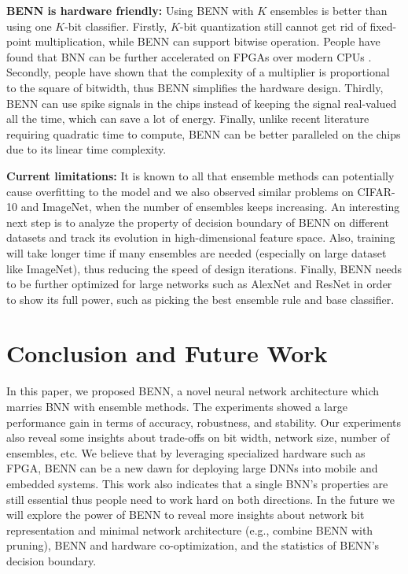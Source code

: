 \documentclass[10pt,twocolumn,letterpaper]{article}
\begin{document}
\textbf{BENN is hardware friendly:} Using BENN with $K$ ensembles is better than using one $K$-bit classifier. Firstly, $K$-bit quantization still cannot get rid of fixed-point multiplication, while BENN can support bitwise operation. People have found that BNN can be further accelerated on FPGAs over modern CPUs \cite{zhao2017accelerating, fu2018towards}. Secondly, people have shown that the complexity of a multiplier is proportional to the square of bitwidth, thus BENN simplifies the hardware design. Thirdly, BENN can use spike signals in the chips instead of keeping the signal real-valued all the time, which can save a lot of energy. Finally, unlike recent literature requiring quadratic time to compute, BENN can be better paralleled on the chips due to its linear time complexity.

\textbf{Current limitations: } It is known to all that ensemble methods can potentially cause overfitting to the model and we also observed similar problems on CIFAR-10 and ImageNet, when the number of ensembles keeps increasing. An interesting next step is to analyze the property of decision boundary of BENN on different datasets and track its evolution in high-dimensional feature space. Also, training will take longer time if many ensembles are needed (especially on large dataset like ImageNet), thus reducing the speed of design iterations. Finally, BENN needs to be further optimized for large networks such as AlexNet and ResNet in order to show its full power, such as picking the best ensemble rule and base classifier.

\section{Conclusion and Future Work}

In this paper, we proposed BENN, a novel neural network architecture which marries BNN with ensemble methods. The experiments showed a large performance gain in terms of accuracy, robustness, and stability. Our experiments also reveal some insights about trade-offs on bit width, network size, number of ensembles, etc. We believe that by leveraging specialized hardware such as FPGA, BENN can be a new dawn for deploying large DNNs into mobile and embedded systems. This work also indicates that a single BNN's properties are still essential thus people need to work hard on both directions. In the future we will explore the power of BENN to reveal more insights about network bit representation and minimal network architecture (e.g., combine BENN with pruning), BENN and hardware co-optimization, and the statistics of BENN's decision boundary.
\end{document}
